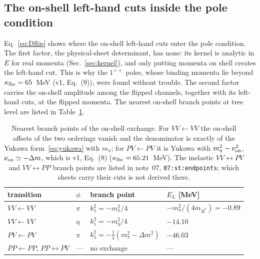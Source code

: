 \documentclass[11pt]{article}
\begin{document}
\subsection{The on-shell left-hand cuts inside the pole condition}\label{sec:lhc}

Eq.~\eqref{eq:Dflip} shows where the on-shell left-hand cuts enter the pole condition. The first factor, the physical-sheet determinant, has none: its kernel is analytic in $E$ for real momenta (Sec.~\ref{sec:kernel}), and only putting momenta on shell creates the left-hand cut. This is why the $1^{++}$ poles, whose binding momenta lie beyond $\kappa_{\rm lhc}=65$~MeV (v1, Eq.~(9)), were found without trouble. The second factor carries the on-shell amplitude among the flipped channels, together with its left-hand cuts, at the flipped momenta. The nearest on-shell branch points at tree level are listed in Table~\ref{tab:lhc}.
\begin{table}[h]
\centering
\begin{tabular}{llll}
\toprule
transition & $\phi$ & branch point & $E_L$ [MeV]\\
\midrule
$VV\leftarrow VV$ & $\pi$ & $k_1^2=-m_\pi^2/4$ & $-m_\pi^2/(4m_{B^*})=-0.89$\\
$VV\leftarrow VV$ & $\eta$ & $k_1^2=-m_\eta^2/4$ & $-14.10$\\
$PV\leftarrow PV$ & $\pi$ & $k_5^2=-\frac14(m_\pi^2-\Delta m^2)$ & $-46.03$\\
$PP\leftarrow PP$, $PP\leftrightarrow PV$ & --- & no exchange & ---\\
\bottomrule
\end{tabular}
\caption{Nearest branch points of the on-shell exchange. For $VV\leftarrow VV$ the on-shell offsets of the two orderings vanish and the denominator is exactly of the Yukawa form~\eqref{eq:yukawa} with $m_\pi$; for $PV\leftarrow PV$ it is Yukawa with $m_\pi^2-\nu_{\rm on}^2$, $\nu_{\rm on}\simeq-\Delta m$, which is v1, Eq.~(8) ($\kappa_{\rm lhc}=65.21$~MeV). The inelastic $VV\leftrightarrow PV$ and $VV\leftrightarrow PP$ branch points are listed in note~07, \texttt{07:st:endpoints}; which sheets carry their cuts is not derived there.}
\label{tab:lhc}
\end{table}
\end{document}
